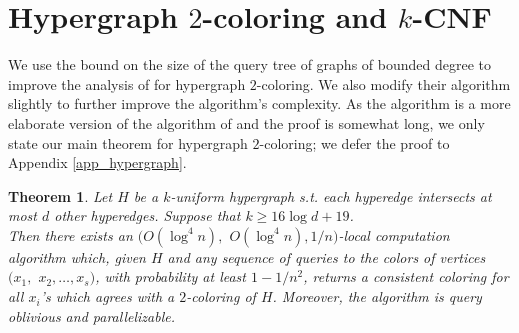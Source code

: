 \documentclass[english, oribibl]{llncs}
\newtheorem{theorem}{Theorem}[section]
\begin{document}
\begin{comment}
\subsection{Tightness of the bound}
Our bound of $O(\log n)$ on the size of the tree is tight.
\begin{theorem}
For any graph $G=(V,E)$ with bounded degree $d$,  $d \geq 2$,
there is a constant $C(d)$ which depends only on $d$ such that for all large enough $n$,
\begin{center}
$\Pr[|T|<C(d)\log{n}]>1/n^2.$
\end{center}
\end{theorem}
\begin{proof}
Consider a path of length $\log n$ from $v_0$.
The probability that the rank of every vertex $w$ on the path is less than the rank of
$\text{parent}(w)$ is $1/(\log n)!>1/n^2$. \qed

\end{proof}

\end{comment} 





\section{\texorpdfstring{Hypergraph $2$-coloring and $k$-CNF}{Hypergraph 2-coloring and k-CNF}}
\label{hypergraph}
We use the bound  on the size of the query tree of graphs of bounded degree to improve the analysis of \cite{ARV+11} for hypergraph $2$-coloring. We also modify their algorithm slightly to further improve the algorithm's complexity.
As the algorithm is a more elaborate version of the algorithm of \cite{ARV+11} and the proof is somewhat long, we only state our main theorem for hypergraph $2$-coloring; we defer the proof to  Appendix \ref{app_hypergraph}.
\begin{theorem}
Let $H$ be a $k$-uniform hypergraph s.t. each hyperedge intersects at most $d$ other hyperedges.
Suppose that $k \geq 16 \log{d} + 19$. \\
Then there exists an $(O(\log^4{n}), $ $O(\log^4{n}), 1/n)$-local computation algorithm which, given $H$ and any sequence of
queries to the colors of vertices $(x_1, $ $x_2, \ldots, x_s)$, 
with probability at least $1-1/n^2$,
returns a consistent coloring for all $x_i$'s which 
agrees with a $2$-coloring of $H$. 
Moreover, the algorithm is query oblivious and parallelizable. 
\end{theorem}
\end{document}
